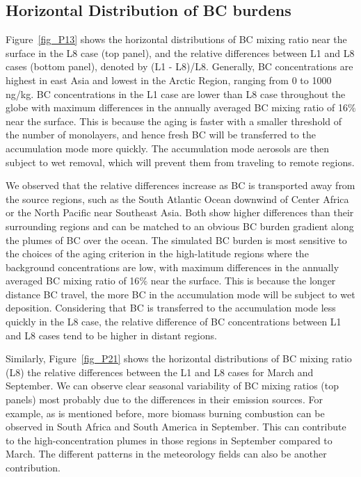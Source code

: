 \documentclass[12pt, fullpage]{uiucthesis2009}
\begin{document}
	\subsection{Horizontal Distribution of BC burdens}
	Figure~\ref{fig_P13} shows the horizontal distributions of BC mixing ratio near the surface in the L8 case (top panel), and the relative differences between L1 and L8 cases (bottom panel), denoted by (L1 - L8)/L8. Generally, BC concentrations are highest in east Asia and lowest in the Arctic Region, ranging from 0 to 1000 ng/kg. BC concentrations in the L1 case are lower than L8 case throughout the globe with maximum differences in the annually averaged BC mixing ratio of 16$\%$ near the surface. This is because the aging is faster with a smaller threshold of the number of monolayers, and hence fresh BC will be transferred to the accumulation mode more quickly. The accumulation mode aerosols are then subject to wet removal, which will prevent them from traveling to remote regions.     
	
	We observed that the relative differences increase as BC is transported away from the source regions, such as the South Atlantic Ocean downwind of Center Africa or the North Pacific near Southeast Asia. Both show higher differences than their surrounding regions and can be matched to an obvious BC burden gradient along the plumes of BC over the ocean. The simulated BC burden is most sensitive to the choices of the aging criterion in the high-latitude regions where the background concentrations are low, with maximum differences in the annually averaged BC mixing ratio of 16$\%$ near the surface. This is because the longer distance BC travel, the more BC in the accumulation mode will be subject to wet deposition. Considering that BC is transferred to the accumulation mode less quickly in the L8 case, the relative difference of BC concentrations between L1 and L8 cases tend to be higher in distant regions.
	
	Similarly, Figure~\ref{fig_P21} shows the horizontal distributions of BC mixing ratio (L8) the relative differences between the L1 and L8 cases for March and September. We can observe clear seasonal variability of BC mixing ratios (top panels) most probably due to the differences in their emission sources. For example, as is mentioned before, more biomass burning combustion can be observed in South Africa and South America in September. This can contribute to the high-concentration plumes in those regions in September compared to March. The different patterns in the meteorology fields can also be another contribution.
	
\end{document}
